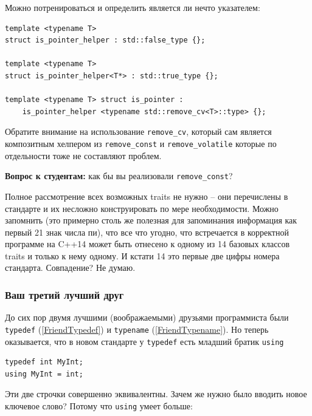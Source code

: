\documentclass[a4paper,12pt,oneside]{article}
\newif\ifanswers
\begin{document}
Можно потренироваться и определить является ли нечто указателем:

\begin{lstlisting}
template <typename T> 
struct is_pointer_helper : std::false_type {};

template <typename T> 
struct is_pointer_helper<T*> : std::true_type {};

template <typename T> struct is_pointer : 
    is_pointer_helper <typename std::remove_cv<T>::type> {};
\end{lstlisting}

Обратите внимание на использование \lstinline!remove_cv!, который сам является композитным хелпером из \lstinline!remove_const! и \lstinline!remove_volatile! которые по отдельности тоже не составляют проблем.

\textbf{Вопрос к студентам:} как бы вы реализовали \lstinline!remove_const!? 

\ifanswers
Правильный ответ:

\begin{lstlisting}
template <typename T> 
struct remove_const { typedef T type; };
template <typename T> 
struct remove_const<const T> { typedef T type; };
\end{lstlisting}
\fi

Полное рассмотрение всех возможных traits не нужно -- они перечислены в стандарте и их несложно конструировать по мере необходимости. Можно запомнить (это примерно столь же полезная для запоминания информация как первый 21 знак числа пи), что все что угодно, что встречается в корректной программе на C++14 может быть отнесено к одному из 14 базовых классов traits и только к нему одному. И кстати 14 это первые две цифры номера стандарта. Совпадение? Не думаю.

\subsubsection{Ваш третий лучший друг}\label{FriendUsing}

До сих пор двумя лучшими (воображаемыми) друзьями программиста были \lstinline!typedef! (\ref{FriendTypedef}) и \lstinline!typename! (\ref{FriendTypename}). Но теперь оказывается, что в новом стандарте у \lstinline!typedef! есть младший братик \lstinline!using!

\begin{lstlisting}
typedef int MyInt;
using MyInt = int;
\end{lstlisting}

Эти две строчки совершенно эквивалентны. Зачем же нужно было вводить новое ключевое слово? Потому что \lstinline!using! умеет больше:
\end{document}
